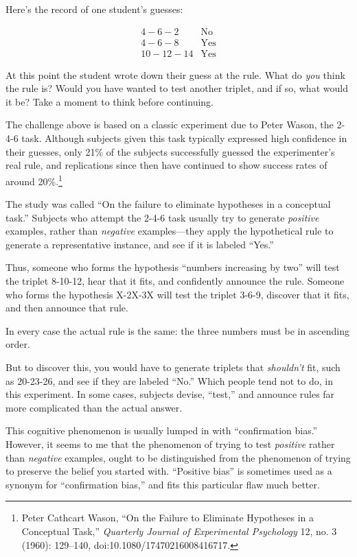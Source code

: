 {
 Here's the record of one student's
guesses:\newline
}

\begin{equation*}
  \begin{array}{ll}
    4-6-2  & \text{No}\\
    4-6-8  & \text{Yes}\\
    10-12-14 & \text{Yes}
  \end{array}
\end{equation*}

{
 At this point the student wrote down their guess at the rule. What
do \textit{you} think the rule is? Would you have wanted to test
another triplet, and if so, what would it be? Take a moment to think
before continuing. }

{
 The challenge above is based on a classic experiment due to Peter
Wason, the 2-4-6 task. Although subjects given this task typically
expressed high confidence in their guesses, only 21\% of the subjects
successfully guessed the experimenter's real rule, and
replications since then have continued to show success rates of around
20\%.\footnote{Peter Cathcart Wason, ``On the Failure to
Eliminate Hypotheses in a Conceptual Task,''
\textit{Quarterly Journal of Experimental Psychology} 12, no. 3 (1960):
129--140, doi:10.1080/17470216008416717.}}

{
 The study was called ``On the failure to
eliminate hypotheses in a conceptual task.'' Subjects
who attempt the 2-4-6 task usually try to generate \textit{positive}
examples, rather than \textit{negative} examples---they apply the
hypothetical rule to generate a representative instance, and see if it
is labeled ``Yes.''}

{
 Thus, someone who forms the hypothesis ``numbers
increasing by two'' will test the triplet 8-10-12,
hear that it fits, and confidently announce the rule. Someone who forms
the hypothesis X-2X-3X will test the triplet 3-6-9, discover that it
fits, and then announce that rule.}

{
 In every case the actual rule is the same: the three numbers must
be in ascending order.}

{
 But to discover this, you would have to generate triplets that
\textit{shouldn't} fit, such as 20-23-26, and see if
they are labeled ``No.'' Which
people tend not to do, in this experiment. In some cases, subjects
devise, ``test,'' and announce rules
far more complicated than the actual answer.}

{
 This cognitive phenomenon is usually lumped in with
``confirmation bias.'' However, it
seems to me that the phenomenon of trying to test \textit{positive}
rather than \textit{negative} examples, ought to be distinguished from
the phenomenon of trying to preserve the belief you started with.
``Positive bias'' is sometimes used
as a synonym for ``confirmation
bias,'' and fits this particular flaw much better.}

